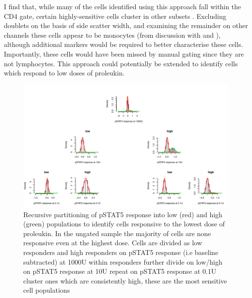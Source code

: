 I find that, while many of the cells identified using this approach fall within the CD4 gate,
certain highly-sensitive cells cluster in other subsets .
Excluding doublets on the basis of side scatter width,
and examining the remainder on other channels these cells appear to be monocytes (from discussion with  and ),
although additional markers would be required to better characterise these cells.
Importantly, these cells would have been missed by manual gating since they are not lymphocytes.
This approach could potentially be extended to identify cells which respond to low doses of proleukin.


\hspace{-2cm}
\begin{figure}[h]
\centering
\includegraphics[scale=.5]{IL2/figures/pstat5-rpart.pdf}
{ Recursive partitioning of pSTAT5 response into low (red) and high (green) populations to identify cells responsive to the lowest dose of proleukin. }
{
In the ungated sample the majority of cells are none responsive even at the highest dose.
Cells are divided as low responders and high responders on pSTAT5 response (i.e baseline subtracted) at 1000U 
within responders further divide on low/high on pSTAT5 response at 10U
repeat on pSTAT5 response at 0.1U
cluster ones which are consistently high, these are the most sensitive cell populations 
}
\end{figure}


